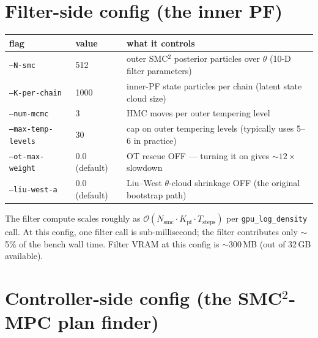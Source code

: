 \documentclass[11pt,a4paper]{article}
\begin{document}
\section*{Filter-side config (the inner PF)}

\begin{tabular}{lll}
\toprule
flag & value & what it controls \\
\midrule
\texttt{--N-smc}            & 512        & outer SMC$^2$ posterior particles over $\theta$ (10-D filter parameters) \\
\texttt{--K-per-chain}      & 1000       & inner-PF state particles per chain (latent state cloud size) \\
\texttt{--num-mcmc}         & 3          & HMC moves per outer tempering level \\
\texttt{--max-temp-levels}  & 30         & cap on outer tempering levels (typically uses 5--6 in practice) \\
\texttt{--ot-max-weight}    & 0.0 (default) & OT rescue OFF — turning it on gives $\sim 12\times$ slowdown \\
\texttt{--liu-west-a}       & 0.0 (default) & Liu--West $\theta$-cloud shrinkage OFF (the original bootstrap path) \\
\bottomrule
\end{tabular}

The filter compute scales roughly as $\mathcal{O}(N_{\text{smc}}
\cdot K_{\text{pf}} \cdot T_{\text{steps}})$ per
\texttt{gpu\_log\_density} call. At this config, one filter call is
sub-millisecond; the filter contributes only $\sim$5\% of the bench
wall time. Filter VRAM at this config is $\sim$300\,MB (out of 32\,GB
available).

\section*{Controller-side config (the SMC$^2$-MPC plan finder)}
\end{document}
